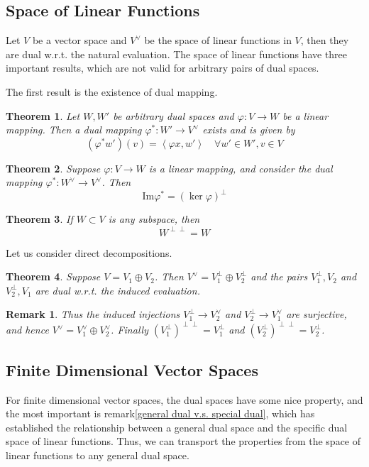 \documentclass{book}
\newtheorem{theorem}{Theorem}[section]
\newtheorem*{remark}{Remark}
\theoremstyle{definition}
\begin{document}
\subsection{Space of Linear Functions}
Let $V$ be a vector space and $V^\vee $ be the space of linear functions in $V$, then they are dual w.r.t. the natural evaluation.
The space of linear functions have three important results, which are not valid for arbitrary pairs of dual spaces.\par
The first result is the existence of dual mapping.
\begin{theorem}
Let $W,W'$ be arbitrary dual spaces and $\varphi:V\to W$ be a linear mapping. Then a dual mapping $\varphi^*:W'\to V^\vee  $ exists and is given by \[(\varphi^*w')(v)=\left\langle \varphi x,w'\right\rangle\quad\forall w'\in W', v\in V\]
\end{theorem}

\begin{theorem}
Suppose $\varphi:V\to W$ is a linear mapping, and consider the dual mapping $\varphi^*:W^\vee\to V^\vee$. Then \[ \text{Im}\varphi^*=(\ker \varphi)^\perp\]
\end{theorem}

\begin{theorem}
If $W\subset V$ is any subspace, then \[ W^{\perp\perp}=W\]
\end{theorem}
Let us consider direct decompositions.
\begin{theorem}
Suppose $V=V_1\oplus V_2$. Then $V^\vee=V_1^\perp\oplus V_2^\perp $ and the pairs $V_1^\perp,V_2$ and $V_2^\perp,V_1$ are dual w.r.t. the induced evaluation.
\end{theorem}
\begin{remark}
Thus the induced injections $V_1^\perp \to V_2^\vee$ and $V_2^\perp\to V_1^\vee$ are surjective, and hence $V^\vee=V_1^\vee\oplus V_2^\vee$. Finally $(V_1^\perp)^{\perp\perp}=V_1^\perp$ and $(V_2^\perp)^{\perp\perp}=V_2^\perp$.
\end{remark}


\subsection{Finite Dimensional Vector Spaces}
For finite dimensional vector spaces, the dual spaces have some nice property, and the most important is remark\ref{general dual v.s. special dual}, which has established the relationship between a general dual space and the specific dual space of linear functions. Thus, we can transport the properties from the space of linear functions to any general dual space.
\end{document}
